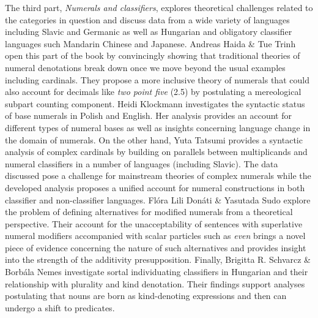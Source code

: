 \documentclass[output=paper]{langscibook}
\begin{document}
The third part, \textit{Numerals and classifiers}, explores theoretical challenges related to the categories in question and discuss data from a wide variety of languages including Slavic and Germanic as well as Hungarian and obligatory classifier languages such Mandarin Chinese and Japanese. Andreas Haida \& Tue Trinh open this part of the book by convincingly showing that traditional theories of numeral denotations break down once we move beyond the usual examples including cardinals. They propose a more inclusive theory of numerals that could also account for decimals like \textit{two point five} (2.5) by postulating a mereological subpart counting component. Heidi Klockmann investigates the syntactic status of base numerals in Polish and English. Her analysis provides an account for different types of numeral bases as well as insights concerning language change in the domain of numerals. On the other hand, Yuta Tatsumi provides a syntactic analysis of complex cardinals by building on parallels between multiplicands and numeral classifiers in a number of languages (including Slavic). The data discussed pose a challenge for mainstream theories of complex numerals while the developed analysis proposes a unified account for numeral constructions in both classifier and non-classifier languages. Flóra Lili Donáti \& Yasutada Sudo explore the problem of defining alternatives for modified numerals from a theoretical perspective. Their account for the unacceptability of sentences with superlative numeral modifiers accompanied with scalar particles such as \textit{even} brings a novel piece of evidence concerning the nature of such alternatives and provides insight into the strength of the additivity presupposition. Finally, Brigitta R. Schvarcz \& Borbála Nemes investigate sortal individuating classifiers in Hungarian and their relationship with plurality and kind denotation. Their findings support analyses postulating that nouns are born as kind-denoting expressions and then can undergo a shift to predicates.
\end{document}
